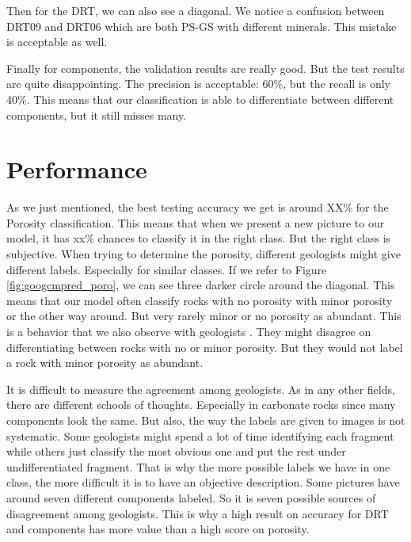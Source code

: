 Then for the DRT, we can also see a diagonal. We notice a confusion between DRT09 and DRT06 which are both PS-GS with different minerals. This mistake is acceptable as well.

Finally for components, the validation results are really good. But the test results are quite disappointing. The precision is acceptable: 60\%, but the recall is only 40\%. This means that our classification is able to differentiate between different components, but it still misses many.

\section{Performance} \label{sec:perf}

As we just mentioned, the best testing accuracy we get is around XX\% for the Porosity classification. This means that when we present a new picture to our model, it has xx\% chances to classify it in the right class. But the right class is subjective. When trying to determine the porosity, different geologists might give different labels. Especially for similar classes. If we refer to Figure \ref{fig:googcmpred_poro}, we can see three darker circle around the diagonal. This means that our model often classify rocks with no porosity with minor porosity or the other way around. But very rarely minor or no porosity as abundant. This is a behavior that we also observe with geologists \cite{thesis_imperial}.
They might disagree on differentiating between rocks with no or minor porosity. But they would not label a rock with minor porosity as abundant. 

It is difficult to measure the agreement among geologists. As in any other fields, there are different schools of thoughts. Especially in carbonate rocks since many components look the same. But also, the way the labels are given to images is not systematic. Some geologists might spend a lot of time identifying each fragment while others just classify the most obvious one and put the rest under undifferentiated fragment. That is why the more possible labels we have in one class, the more difficult it is to have an objective description. Some pictures have around seven different components labeled. So it is seven possible sources of disagreement among geologists. This is why a high result on accuracy for DRT and components has more value than a high score on porosity. 

